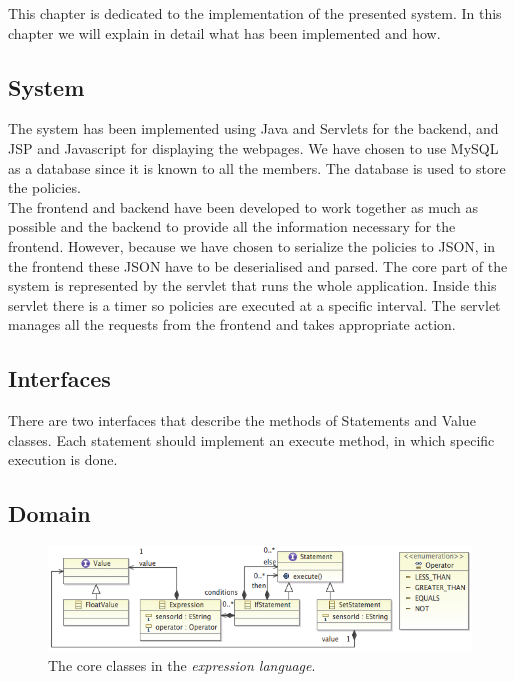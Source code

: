 This chapter is dedicated to the implementation of the presented system. In this chapter we will explain in detail what has been implemented and how. 

\subsection{System}
The system has been implemented using Java and Servlets for the backend, and JSP and Javascript for displaying the webpages. We have chosen to use MySQL as a database since it is known to all the members. The database is used to store the policies. 
\\The frontend and backend have been developed to work together as much as possible and the backend to provide all the information necessary for the frontend. However, because we have chosen to serialize the policies to JSON, in the frontend these JSON have to be deserialised and parsed. 
The core part of the system is represented by the servlet that runs the whole application. Inside this servlet there is a timer so policies are executed at a specific interval. The servlet manages all the requests from the frontend and takes appropriate action. 
\subsection{Interfaces}
There are two interfaces that describe the methods of Statements and Value classes. Each statement should implement an execute method, in which specific execution is done. 
\subsection{Domain}
\begin{figure}
	\centering
    \includegraphics[scale=0.55]{chapters/implementation-model-expression-language.png} 
	\caption{The core classes in the \textit{expression language}.}
	\label{fig:ecore-sensors-actuators}
\end{figure}

